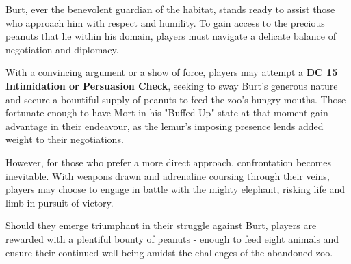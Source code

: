 {\entryfont \noindent Burt, ever the benevolent guardian of the habitat, stands ready to assist those who approach him with respect and humility. To gain access to the precious peanuts that lie within his domain, players must navigate a delicate balance of negotiation and diplomacy.

With a convincing argument or a show of force, players may attempt a \textbf{DC 15 Intimidation or Persuasion Check}, seeking to sway Burt's generous nature and secure a bountiful supply of peanuts to feed the zoo's hungry mouths. Those fortunate enough to have Mort in his "Buffed Up" state at that moment gain advantage in their endeavour, as the lemur's imposing presence lends added weight to their negotiations.

However, for those who prefer a more direct approach, confrontation becomes inevitable. With weapons drawn and adrenaline coursing through their veins, players may choose to engage in battle with the mighty elephant, risking life and limb in pursuit of victory.

Should they emerge triumphant in their struggle against Burt, players are rewarded with a plentiful bounty of peanuts - enough to feed eight animals and ensure their continued well-being amidst the challenges of the abandoned zoo.}